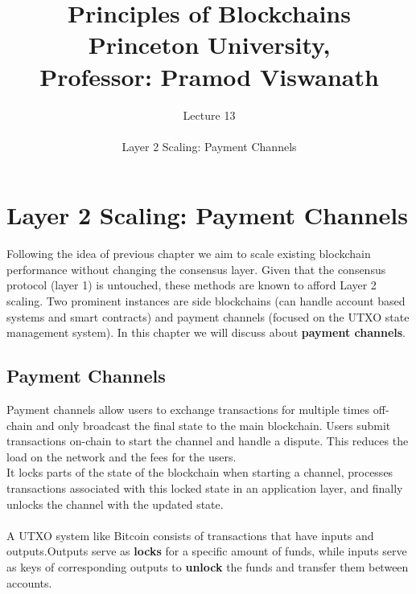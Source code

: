 \documentclass{report}
\title{\Huge{Principles of Blockchains \\ Princeton University,\\
		Professor: Pramod Viswanath}}
\author{\huge{Lecture 13} \\\\ Layer 2 Scaling: Payment Channels}
\begin{document}
\maketitle
\newpage%
\tableofcontents
\pagebreak

\chapter{Layer 2 Scaling: Payment Channels}
Following the idea of previous chapter we aim to scale existing blockchain performance without changing the consensus layer. Given that the consensus protocol (layer 1) is untouched, these methods are known to afford Layer 2 scaling. Two prominent
instances are side blockchains (can handle account based systems and smart contracts) and payment channels (focused on the UTXO state management system). In this chapter we will discuss about \textbf{payment channels}.

\section{Payment Channels}
Payment channels allow users to exchange transactions for multiple times off-chain and only broadcast the final state to the main blockchain. Users submit transactions on-chain to start the channel and handle a dispute. This reduces the load on the network and the fees for the users. \\
It locks parts of the state of the blockchain when starting a channel, processes transactions associated with this locked state in an application layer, and finally unlocks the channel with the updated state.\\\\
A UTXO system like Bitcoin consists of transactions that have inputs and outputs.Outputs serve as \textbf{locks} for a specific amount of funds, while inputs serve as keys of corresponding outputs to \textbf{unlock} the funds and transfer them between accounts.
\end{document}

